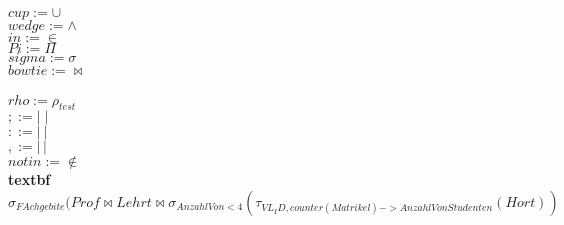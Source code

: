 \documentclass{article}
\begin{document}
$ cup := \cup$\\
$ wedge := \wedge$\\
$in := \in$\\
$ Pi := \Pi$\\
$sigma := \sigma$\\
$bowtie := \bowtie$\\\\
$rho := \rho_{test}$\\
$ ; :=|\;|$\\
$: := |\:|$\\
$, := |\,|$\\
$ notin := \notin$\\
\textbf{textbf}\\
$	
	\sigma_{FAchgebite}(Prof \bowtie Lehrt \bowtie \sigma_{AnzahlVon < 4}(\tau_{VL_ID, counter(Matrikel) -> AnzahlVonStudenten}(Hort))
$
\end{document}
